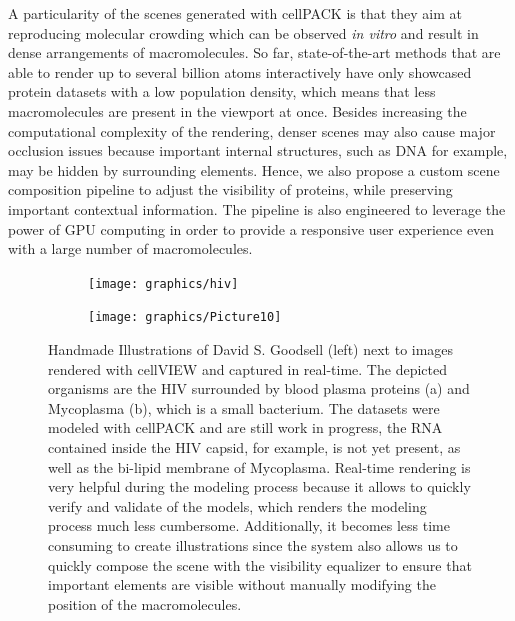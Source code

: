 A particularity of the scenes generated with cellPACK is that they aim at reproducing molecular crowding which can be observed \textit{in vitro} and result in dense arrangements of macromolecules.
So far, state-of-the-art methods that are able to render up to several billion atoms interactively have only showcased protein datasets with a low population density, which means that less macromolecules are present in the viewport at once.
Besides increasing the computational complexity of the rendering, denser scenes may also cause major occlusion issues because important internal structures, such as DNA for example, may be hidden by surrounding elements.
Hence, we also propose a custom scene composition pipeline to adjust the visibility of proteins, while preserving important contextual information.
The pipeline is also engineered to leverage the power of GPU computing in order to provide a responsive user experience even with a large number of macromolecules.

\begin{figure}
	\centering
	\begin{subfigure}[b]{0.99\textwidth}
		\texttt{[image: graphics/hiv]}
	\end{subfigure}
	
	\begin{subfigure}[b]{0.99\textwidth}
		\texttt{[image: graphics/Picture10]}
	\end{subfigure}
	\caption{Handmade Illustrations of David S. Goodsell (left) next to images rendered with cellVIEW and captured in real-time. The depicted organisms are the HIV surrounded by blood plasma proteins (a) and Mycoplasma (b), which is a small bacterium. The datasets were modeled with cellPACK and are still work in progress, the RNA contained inside the HIV capsid, for example, is not yet present, as well as the bi-lipid membrane of Mycoplasma. Real-time rendering is very helpful during the modeling process because it allows to quickly verify and validate of the models, which renders the modeling process much less cumbersome. Additionally, it becomes less time consuming to create illustrations since the system also allows us to quickly compose the scene with the visibility equalizer to ensure that important elements are visible without manually modifying the position of the macromolecules.}
	\label{fig:cellVIEWvsGoodsell}
\end{figure}

%

